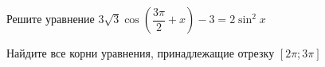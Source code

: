 \begin{ex}
	\begin{condition}
		\begin{enumcols}[label=\asbuk*)]
			\item Решите уравнение \( 3\sqrt{3}\cos\left(\dfrac{3\pi}{2}+x\right)-3 = 2\sin^2x \)
			\item Найдите все корни уравнения, принадлежащие отрезку \( \left[2\pi;3\pi\right] \)
		\end{enumcols}
	\end{condition}
\end{ex}